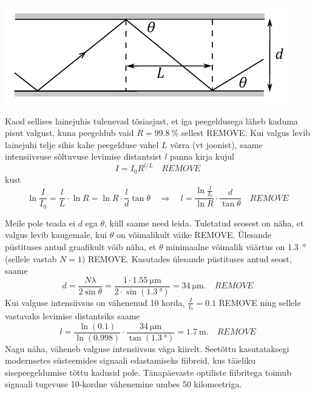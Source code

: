 \documentclass[10pt]{article}
\newcommand{\pp}[1]{REMOVE}
\begin{document}

\solu
\begin{center}
\includegraphics[]{2021-v2g-08-yl.pdf}
\end{center}

Kaod sellises lainejuhis tulenevad tõsiasjast, et iga peegeldusega läheb kaduma pisut valgust, kuna peegeldub vaid $R=\SI{99.8}{\percent}$ sellest \pp{1}. Kui valgus levib lainejuhi telje sihis kahe peegelduse vahel $L$ võrra (vt joonist), saame intensiivsuse sõltuvuse levimise distantsist $l$ panna kirja kujul
$$I=I_0 R^{l/L} \quad \pp{2}$$
kust
$$ \ln \frac{I}{I_0}=
\frac{l}{L}  \cdot \ln R=
\ln R \cdot\frac{l}{d}\tan\theta
\quad \Rightarrow \quad
l = \frac{\ln\frac{I}{I_0}}{\ln R}\cdot\frac{d}{\tan\theta}
\quad \pp{2}$$

Meile pole teada ei $d$ ega $\theta$, küll saame need leida. Tuletatud seosest on näha, et valgus levib kaugemale, kui $\theta$ on võimalikult väike \pp{1}. Ülesande püstituses antud graafikult võib näha, et $\theta$ minimaalne võimalik väärtus on \SI{1.3}{\degree} (sellele vastab $N=1$) \pp{1}. Kasutades ülesande püstituses antud seost, saame
$$d = \frac{N\lambda}{2\sin\theta}=\frac{1\cdot\SI{1.55}{\micro\m}}{2\cdot\sin(\SI{1.3}{\degree})}=\SI{34}{\micro\m}. \quad \pp{1}$$
Kui valguse intensiivsus on vähenenud 10 korda, $\frac{I}{I_0}=0.1$ \pp{1} ning sellele vastavaks levimise distantsiks saame
$$l=\frac{\ln(\num{0.1})}{\ln(\num{0.998})}\cdot\frac{\SI{34}{\micro\m}}{\tan(\SI{1.3}{\degree})}=\SI{1.7}{\m}. \quad \pp{1}$$
Nagu näha, väheneb valguse intensiivsus väga kiirelt. Seetõttu kasutataksegi modernsetes süsteemides signaali edastamiseks fiibreid, kus täieliku sisepeegeldumise tõttu kadusid pole. Tänapäevaste optiliste fiibritega toimub signaali tugevuse 10-kordne vähenemine umbes 50 kilomeetriga.
\probend
\bigskip

\end{document}
